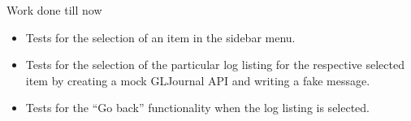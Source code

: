 \documentclass[ignorenonframetext,aspectratio=169]{beamer}
\begin{document}
\begin{frame}{Work done till now}

\begin{itemize}
\itemsep1pt\parskip0pt
\item
  Tests for the selection of an item in the sidebar menu.
\item
  Tests for the selection of the particular log listing for the
  respective selected item by creating a mock GLJournal API and writing
  a fake message.
\item
  Tests for the ``Go back'' functionality when the log listing is
  selected.
\end{itemize}

\end{frame}
\end{document}
